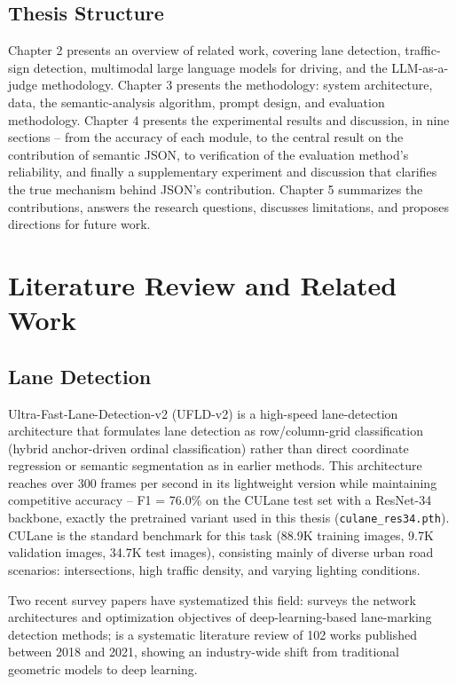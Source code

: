 \documentclass[12pt,a4paper]{report}
\begin{document}
\section{Thesis Structure}

Chapter 2 presents an overview of related work, covering lane detection, traffic-sign detection, multimodal large language models for driving, and the LLM-as-a-judge methodology. Chapter 3 presents the methodology: system architecture, data, the semantic-analysis algorithm, prompt design, and evaluation methodology. Chapter 4 presents the experimental results and discussion, in nine sections -- from the accuracy of each module, to the central result on the contribution of semantic JSON, to verification of the evaluation method's reliability, and finally a supplementary experiment and discussion that clarifies the true mechanism behind JSON's contribution. Chapter 5 summarizes the contributions, answers the research questions, discusses limitations, and proposes directions for future work.

\chapter{Literature Review and Related Work}

\section{Lane Detection}

Ultra-Fast-Lane-Detection-v2 (UFLD-v2) \cite{qin2022ufldv2} is a high-speed lane-detection architecture that formulates lane detection as row/column-grid classification (hybrid anchor-driven ordinal classification) rather than direct coordinate regression or semantic segmentation as in earlier methods. This architecture reaches over 300 frames per second in its lightweight version while maintaining competitive accuracy -- F1 = 76.0\% on the CULane test set with a ResNet-34 backbone, exactly the pretrained variant used in this thesis (\texttt{culane\_res34.pth}). CULane \cite{pan2018culane} is the standard benchmark for this task (88.9K training images, 9.7K validation images, 34.7K test images), consisting mainly of diverse urban road scenarios: intersections, high traffic density, and varying lighting conditions.

Two recent survey papers have systematized this field: \cite{zhang2021survey} surveys the network architectures and optimization objectives of deep-learning-based lane-marking detection methods; \cite{zakaria2023slr} is a systematic literature review of 102 works published between 2018 and 2021, showing an industry-wide shift from traditional geometric models to deep learning.
\end{document}
